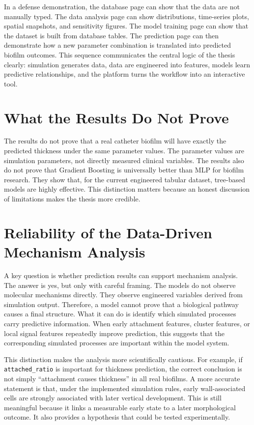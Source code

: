 \documentclass[12pt,a4paper,oneside]{report}
\begin{document}
In a defense demonstration, the database page can show that the data are not manually typed. The data analysis page can show distributions, time-series plots, spatial snapshots, and sensitivity figures. The model training page can show that the dataset is built from database tables. The prediction page can then demonstrate how a new parameter combination is translated into predicted biofilm outcomes. This sequence communicates the central logic of the thesis clearly: simulation generates data, data are engineered into features, models learn predictive relationships, and the platform turns the workflow into an interactive tool.

\section{What the Results Do Not Prove}
The results do not prove that a real catheter biofilm will have exactly the predicted thickness under the same parameter values. The parameter values are simulation parameters, not directly measured clinical variables. The results also do not prove that Gradient Boosting is universally better than MLP for biofilm research. They show that, for the current engineered tabular dataset, tree-based models are highly effective. This distinction matters because an honest discussion of limitations makes the thesis more credible.


\section{Reliability of the Data-Driven Mechanism Analysis}
A key question is whether prediction results can support mechanism analysis. The answer is yes, but only with careful framing. The models do not observe molecular mechanisms directly. They observe engineered variables derived from simulation output. Therefore, a model cannot prove that a biological pathway causes a final structure. What it can do is identify which simulated processes carry predictive information. When early attachment features, cluster features, or local signal features repeatedly improve prediction, this suggests that the corresponding simulated processes are important within the model system.

This distinction makes the analysis more scientifically cautious. For example, if \texttt{attached\_ratio} is important for thickness prediction, the correct conclusion is not simply ``attachment causes thickness'' in all real biofilms. A more accurate statement is that, under the implemented simulation rules, early wall-associated cells are strongly associated with later vertical development. This is still meaningful because it links a measurable early state to a later morphological outcome. It also provides a hypothesis that could be tested experimentally.
\end{document}
